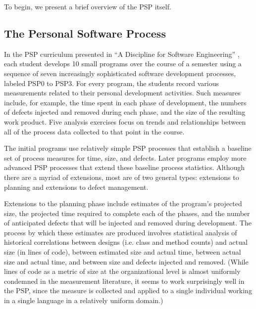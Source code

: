 To begin, we present a brief overview of the PSP itself.

\subsection{The Personal Software Process}

In the PSP curriculum presented in ``A Discipline for Software
Engineering'' \cite{Humphrey95}, each student develops 10 small programs
over the course of a semester using a sequence of seven increasingly
sophisticated software development processes, labeled PSP0 to PSP3.  For
every program, the students record various measurements related to their
personal development activities. Such measures include, for example, the
time spent in each phase of development, the numbers of defects injected
and removed during each phase, and the size of the resulting work product.
Five analysis exercises focus on trends and relationships between 
all of the process data collected to that point in the course.

The initial programs use relatively simple PSP processes that establish a
baseline set of process measures for time, size, and defects. Later
programs employ more advanced PSP processes that extend these baseline
process statistics.  Although there are a myriad of extensions, 
most are of two general types: extensions to planning and extensions
to defect management.

Extensions to the planning phase include estimates of the program's
projected size, the projected time required to complete each of the phases,
and the number of anticipated defects that will be injected and removed
during development.  The process by which these estimates are produced
involves statistical analysis of historical correlations between designs
(i.e. class and method counts) and actual size (in lines of code), between
estimated size and actual time, between actual size and actual time, and
between size and defects injected and removed.  (While lines of code as a
metric of size at the organizational level is almost uniformly condemned
in the measurement literature, it seems to work surprisingly well in the
PSP, since the measure is collected and applied to a single individual working
in a single language in a relatively uniform domain.)

